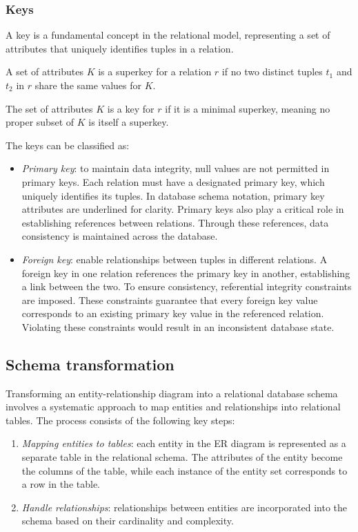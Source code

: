 \subsubsection{Keys}
A key is a fundamental concept in the relational model, representing a set of attributes that uniquely identifies tuples in a relation.
\begin{definition}
    A set of attributes $K$ is a superkey for a relation $r$ if no two distinct tuples $t_1$ and $t_2$ in $r$ share the same values for $K$.
\end{definition}
\begin{definition}
    The set of attributes $K$ is a key for $r$ if it is a minimal superkey, meaning no proper subset of $K$ is itself a superkey.
\end{definition}
\noindent The keys can be classified as: 
\begin{itemize}
    \item \textit{Primary key}: to maintain data integrity, null values are not permitted in primary keys. 
        Each relation must have a designated primary key, which uniquely identifies its tuples. 
        In database schema notation, primary key attributes are underlined for clarity.
        Primary keys also play a critical role in establishing references between relations. 
        Through these references, data consistency is maintained across the database.
    \item \textit{Foreign key}: enable relationships between tuples in different relations. 
        A foreign key in one relation references the primary key in another, establishing a link between the two.
        To ensure consistency, referential integrity constraints are imposed. 
        These constraints guarantee that every foreign key value corresponds to an existing primary key value in the referenced relation. 
        Violating these constraints would result in an inconsistent database state.
\end{itemize}

\subsection{Schema transformation}
Transforming an entity-relationship diagram into a relational database schema involves a systematic approach to map entities and relationships into relational tables. 
The process consists of the following key steps:
\begin{enumerate}
    \item \textit{Mapping entities to tables}: each entity in the ER diagram is represented as a separate table in the relational schema. 
        The attributes of the entity become the columns of the table, while each instance of the entity set corresponds to a row in the table.
    \item \textit{Handle relationships}: relationships between entities are incorporated into the schema based on their cardinality and complexity. 
\end{enumerate}